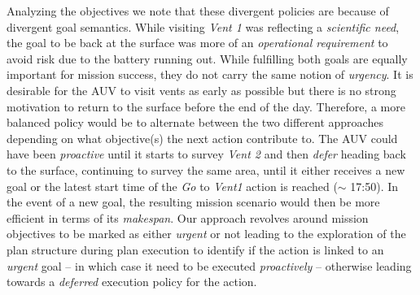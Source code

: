 Analyzing the objectives we note that these divergent policies are
because of divergent goal semantics. While visiting {\em Vent 1} was
reflecting a \emph{scientific need}, the goal to be back at the
surface was more of an \emph{operational requirement} to avoid risk
due to the battery running out. While fulfilling both goals are
equally important for mission success, they do not carry the same
notion of {\em urgency}. It is desirable for the AUV to visit vents as
early as possible but there is no strong motivation to return to the
surface before the end of the day. Therefore, a more balanced policy
would be to alternate between the two different approaches depending
on what objective(s) the next action contribute to. The AUV could have
been {\em proactive} until it starts to survey {\em Vent 2} and then
{\em defer} heading back to the surface, continuing to survey the same
area, until it either receives a new goal or the latest start time of
the {\em Go} to \emph{Vent1} action is reached ($\sim$ 17:50). In the
event of a new goal,
the resulting mission scenario would then be more efficient in terms
of its \emph{makespan}. Our approach revolves around mission
objectives to be marked as either {\em urgent} or not leading to the
exploration of the plan structure during plan execution to identify if
the action is linked to an {\em urgent} goal -- in which case it need
to be executed {\em proactively} -- otherwise leading towards a {\em
  deferred} execution policy for the action.
 


